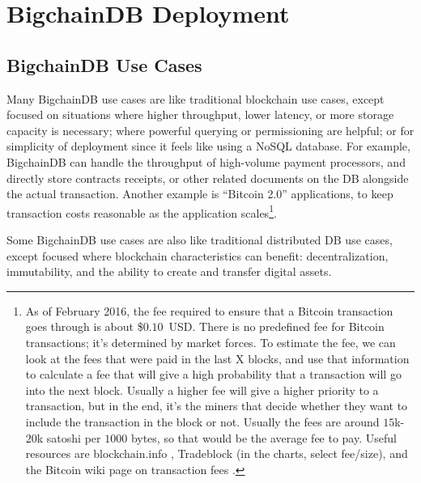 \section{BigchainDB Deployment}\label{sec:deployment}

\subsection{BigchainDB Use Cases}

Many BigchainDB use cases are like traditional blockchain use cases, except focused on situations where higher throughput, lower latency, or more storage capacity is necessary; where powerful querying or permissioning are helpful; or for simplicity of deployment since it feels like using a NoSQL database.
For example, BigchainDB can handle the throughput of high-volume payment processors, and directly store contracts receipts, or other related documents on the DB alongside the actual transaction.
Another example is “Bitcoin 2.0” applications, to keep transaction costs reasonable as the application scales\footnote{
As of February 2016, the fee required to ensure that a Bitcoin transaction goes through is about \$$0.10$~USD. There is no predefined fee for Bitcoin transactions; it's determined by market forces.
To estimate the fee, we can look at the fees that were paid in the last X blocks, and use that information to calculate a fee that will give a high probability that a transaction will go into the next block.
Usually a higher fee will give a higher priority to a transaction, but in the end, it's the miners that decide whether they want to include the transaction in the block or not.
Usually the fees are around $15$k-$20$k satoshi per $1000$ bytes, so that would be the average fee to pay.
Useful resources are blockchain.info \cite{blockchaininfo2015transaction_fees}, Tradeblock \cite{tradeblock} (in the charts, select fee/size), and the Bitcoin wiki page on transaction fees \cite{bitcoin2015fees}.
}.

Some BigchainDB use cases are also like traditional distributed DB use cases, except focused where blockchain characteristics can benefit: decentralization, immutability, and the ability to create and transfer digital assets.

